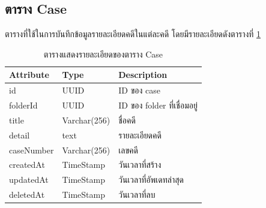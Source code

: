 \documentclass[12pt,oneside,openright,a4paper]{cpe-thai-project}
\begin{document}
\subsection{ตาราง Case}
ตารางที่ใช้ในการบันทึกข้อมูลรายละเอียดคดีในแต่ละคดี โดยมีรายละเอียดดังตารางที่ \ref{tbl:dbCase}
\begin{table}[!ht]
    \centering
    \begin{tabular}{|p{4cm}|p{2cm}|p{6cm}|}
    \hline
    \textbf{Attribute} & \textbf{Type} & \textbf{Description}   \\ \hline
    id         & UUID        & ID ของ case                 \\ \hline
    folderId   & UUID        & ID ของ folder ที่เชื่อมอยู่ \\ \hline
    title      & Varchar(256) & ชื่อคดี                     \\ \hline
    detail     & text        & รายละเอียดคดี               \\ \hline
    caseNumber & Varchar(256) & เลขคดี                      \\ \hline
    createdAt  & TimeStamp   & วันเวลาที่สร้าง             \\ \hline
    updatedAt  & TimeStamp   & วันเวลาที่อัพเดทล่าสุด      \\ \hline
    deletedAt  & TimeStamp   & วันเวลาที่ลบ     \\ \hline
    \end{tabular}
    \caption{\centering  ตารางแสดงรายละเอียดของตาราง Case} \label{tbl:dbCase}
\end{table}
\end{document}
